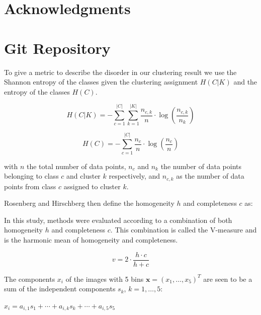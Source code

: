 \documentclass[a4paper,11pt]{article}
\begin{document}
\section*{Acknowledgments}

\appendix{}
\section{Git Repository}

To give a metric to describe the disorder in our clustering result we use the Shannon entropy of the classes given the clustering assignment $H(C|K)$ and the entropy of the classes  $H(C)$.

\begin{equation}
H(C|K) = - \sum_{c=1}^{|C|} \sum_{k=1}^{|K|} \frac{n_{c,k}}{n}
\cdot \log\left(\frac{n_{c,k}}{n_k}\right)
\end{equation}

\begin{equation}
H(C) = - \sum_{c=1}^{|C|} \frac{n_c}{n} \cdot \log\left(\frac{n_c}{n}\right)
\end{equation}

with $n$ the total number of data points, $n_c$ and $n_k$ the number of data points belonging to class $c$ and cluster $k$ respectively, and $n_{c,k}$ as the number of data points from class $c$ assigned to cluster $k$.

Rosenberg and Hirschberg then define the homogeneity $h$ and completeness $c$ as:

    



In this study, methods were evaluated according to a combination of both homogeneity $h$ and completeness $c$. This combination is called the V-measure and is the harmonic mean of homogeneity and completeness.

\begin{equation}
v = 2 \cdot \frac{h \cdot c}{h + c}
\end{equation}

The components $x_i$ of the images with 5 bins $\boldsymbol{x}=(x_1,\ldots,x_5)^T$ are seen to be a sum of the independent components $s_k$, $k=1,\ldots,5$:

$x_i = a_{i,1} s_1 + \cdots + a_{i,k} s_k + \cdots + a_{i,5} s_5$
\end{document}
